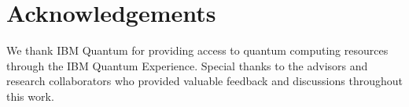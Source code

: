 \documentclass[10pt,twocolumn,a4paper]{article}
\begin{document}
\section{Acknowledgements}
We thank IBM Quantum for providing access to quantum computing resources through the IBM Quantum Experience. Special thanks to the advisors and research collaborators who provided valuable feedback and discussions throughout this work.



\end{document}
